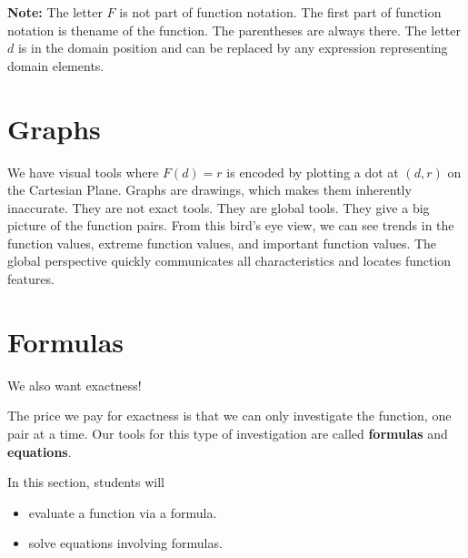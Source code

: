 \documentclass{ximera}
\begin{document}
\textbf{Note:}  The letter $F$ is not part of function notation.  The first part of function notation is thename of the function. The parentheses are always there.  The letter $d$ is in the domain position and can be replaced by any expression representing domain elements.










\section{Graphs}

We have visual tools where $F(d) = r$ is encoded by plotting a dot at $(d, r)$ on the Cartesian Plane.  Graphs are drawings, which makes them inherently inaccurate.  They are not exact tools.  They are global tools.  They give a big picture of the function pairs.  From this bird's eye view, we can see trends in the function values, extreme function values, and important function values. The global perspective quickly communicates all characteristics and locates function features.












\section{Formulas}
We also want exactness!

The price we pay for exactness is that we can only investigate the function, one pair at a time.  Our tools for this type of investigation are called \textbf{formulas} and \textbf{equations}.










\begin{sectionOutcomes}
In this section, students will 

\begin{itemize}
\item evaluate a function via a formula.
\item solve equations involving formulas.
\end{itemize}
\end{sectionOutcomes}
\end{document}

